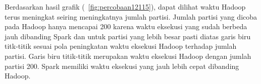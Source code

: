 Berdasarkan hasil grafik (~\ref{fig:percobaan12115}), dapat dilihat waktu Hadoop terus meningkat seiring meningkatnya jumlah partisi. Jumlah partisi yang dicoba pada Hadoop hanya mencapai 200 karena waktu eksekusi yang sudah berbeda jauh dibanding Spark dan untuk partisi yang lebih besar pasti diatas garis biru titk-titik sesuai pola peningkatan waktu eksekusi Hadoop terhadap jumlah partisi. Garis biru titik-titik merupakan waktu eksekusi Hadoop dengan jumlah partisi 200. Spark memiliki waktu eksekusi yang jauh lebih cepat dibanding Hadoop. 


